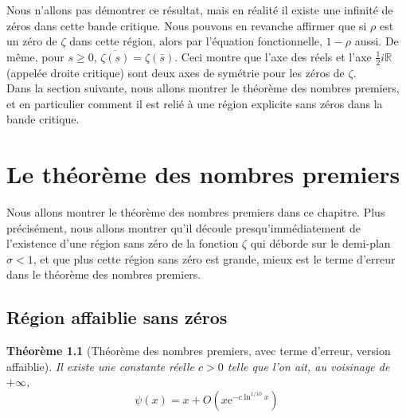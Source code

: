 \documentclass[french]{report}
\newtheorem{theorem}{Théorème}[section]
\begin{document}
Nous n'allons pas démontrer ce résultat, mais en réalité il existe une infinité de zéros dans cette bande critique. Nous pouvons en revanche affirmer que si $\rho$ est un zéro de $\zeta$ dans cette région, alors par l'équation fonctionnelle, $1-\rho$ aussi. De même, pour $s\geq0$, $\overline{\zeta(s)}=\zeta(\bar{s})$. Ceci montre que l'axe des réels et l'axe $\frac{1}{2}i\mathbb{R}$ (appelée droite critique) sont deux axes de symétrie pour les zéros de $\zeta$.
\\

Dans la section suivante, nous allons montrer le théorème des nombres premiers, et en particulier comment il est relié à une région explicite sans zéros dans la bande critique.

\chapter{Le théorème des nombres premiers}

Nous allons montrer le théorème des nombres premiers dans ce chapitre. Plus précisément, nous allons montrer qu'il découle presqu'immédiatement de l'existence d'une région sans zéro de la fonction $\zeta$ qui déborde sur le demi-plan $\sigma<1$, et que plus cette région sans zéro est grande, mieux est le terme d'erreur dans le théorème des nombres premiers.

\section{Région affaiblie sans zéros}\label{section:region-affaiblie}

\begin{theorem}[Théorème des nombres premiers, avec terme d'erreur, version affaiblie]\label{eq:tnp-erreur-1}
  Il existe une constante réelle $c>0$ telle que l'on ait, au voisinage de $+\infty$,
  \begin{equation}
    \psi(x)=x+O(x\mathrm{e}^{-c\ln^{1/10} x})
  \end{equation}
\end{theorem}
\end{document}
